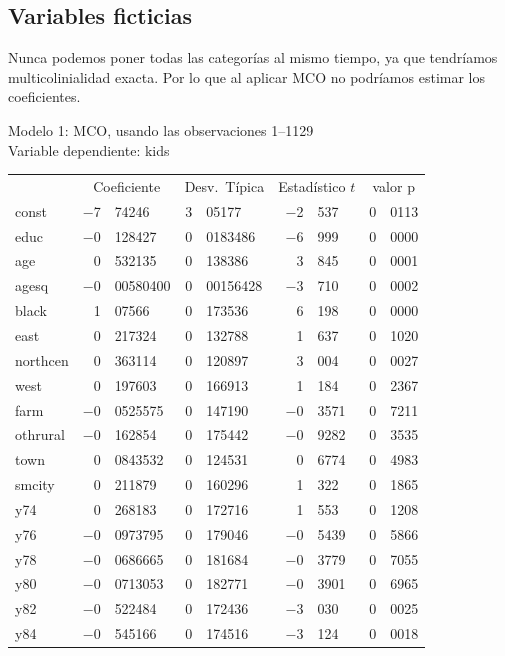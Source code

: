 \subsection{Variables ficticias}
Nunca podemos poner todas las categorías al mismo tiempo, ya que tendríamos multicolinialidad exacta. Por lo que al aplicar MCO no podríamos estimar los coeficientes.

\begin{center}
Modelo 1: MCO, usando las observaciones 1--1129\\
Variable dependiente: kids\\

\vspace{1em}

\begin{tabular}{lr@{,}lr@{,}lr@{,}lr@{,}l}
  &
 \multicolumn{2}{c}{Coeficiente} &
  \multicolumn{2}{c}{Desv.\ Típica} &
   \multicolumn{2}{c}{Estadístico $t$} &
    \multicolumn{2}{c}{valor p} \\[1ex]
const &
  $-$7&74246 &
    3&05177 &
      $-$2&537 &
        0&0113 \\
educ &
  $-$0&128427 &
    0&0183486 &
      $-$6&999 &
        0&0000 \\
age &
  0&532135 &
    0&138386 &
      3&845 &
        0&0001 \\
agesq &
  $-$0&00580400 &
    0&00156428 &
      $-$3&710 &
        0&0002 \\
black &
  1&07566 &
    0&173536 &
      6&198 &
        0&0000 \\
east &
  0&217324 &
    0&132788 &
      1&637 &
        0&1020 \\
northcen &
  0&363114 &
    0&120897 &
      3&004 &
        0&0027 \\
west &
  0&197603 &
    0&166913 &
      1&184 &
        0&2367 \\
farm &
  $-$0&0525575 &
    0&147190 &
      $-$0&3571 &
        0&7211 \\
othrural &
  $-$0&162854 &
    0&175442 &
      $-$0&9282 &
        0&3535 \\
town &
  0&0843532 &
    0&124531 &
      0&6774 &
        0&4983 \\
smcity &
  0&211879 &
    0&160296 &
      1&322 &
        0&1865 \\
y74 &
  0&268183 &
    0&172716 &
      1&553 &
        0&1208 \\
y76 &
  $-$0&0973795 &
    0&179046 &
      $-$0&5439 &
        0&5866 \\
y78 &
  $-$0&0686665 &
    0&181684 &
      $-$0&3779 &
        0&7055 \\
y80 &
  $-$0&0713053 &
    0&182771 &
      $-$0&3901 &
        0&6965 \\
y82 &
  $-$0&522484 &
    0&172436 &
      $-$3&030 &
        0&0025 \\
y84 &
  $-$0&545166 &
    0&174516 &
      $-$3&124 &
        0&0018 \\
\end{tabular}


\end{center}
